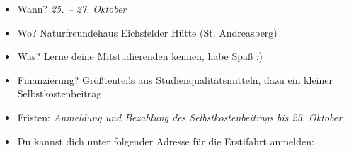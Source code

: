 \begin{itemize}
        \begin{itemize}
            \item Wann? \textit{25. – 27. Oktober}
            \item Wo? Naturfreundehaus Eichsfelder Hütte (St. Andreasberg)
            \item Was? Lerne deine Mitstudierenden kennen, habe Spaß :)
            \item Finanzierung? Größtenteils aus Studienqualitätsmitteln, dazu ein kleiner Selbstkostenbeitrag
            \item Fristen: \textit{Anmeldung und Bezahlung des Selbstkostenbeitrags bis 23. Oktober}
            \item Du kannst dich unter folgender Adresse für die Erstifahrt anmelden: 
        \end{itemize}
    \end{itemize}
